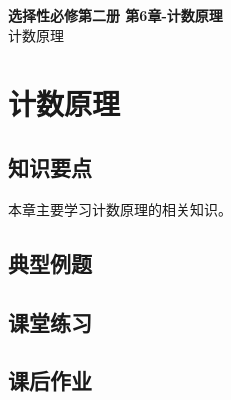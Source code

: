 \documentclass[12pt,a4paper]{article}
\begin{document}
\begin{center}
\LARGE\textbf{选择性必修第二册 第6章-计数原理} \\[0.5em]
\large 计数原理
\end{center}

\tableofcontents
\newpage

\section{计数原理}

\subsection{知识要点}
本章主要学习计数原理的相关知识。

\subsection{典型例题}

\subsection{课堂练习}

\subsection{课后作业}
\end{document}
